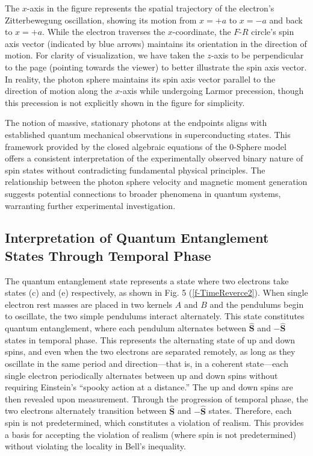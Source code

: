 \documentclass[%
 reprint,
 amsmath,amssymb,
 aps,
]{revtex4-1}
\numberwithin{equation}{section}%
\begin{document}
The $x$-axis in the figure represents the spatial trajectory of the electron's Zitterbewegung oscillation, showing its motion from $x=+a$ to $x=-a$ and back to $x=+a$. While the electron traverses the $x$-coordinate, the $F$-$R$ circle's spin axis vector (indicated by blue arrows) maintains its orientation in the direction of motion. For clarity of visualization, we have taken the $z$-axis to be perpendicular to the page (pointing towards the viewer) to better illustrate the spin axis vector. In reality, the photon sphere maintains its spin axis vector parallel to the direction of motion along the $x$-axis while undergoing Larmor precession, though this precession is not explicitly shown in the figure for simplicity.

The notion of massive, stationary photons at the endpoints aligns with established quantum mechanical observations in superconducting states. This framework provided by the closed algebraic equations of the 0-Sphere model offers a consistent interpretation of the experimentally observed binary nature of spin states without contradicting fundamental physical principles. The relationship between the photon sphere velocity and magnetic moment generation suggests potential connections to broader phenomena in quantum systems, warranting further experimental investigation.


\subsection{Interpretation of Quantum Entanglement States Through Temporal Phase}\label{subsec:quantum_entanglement}

The quantum entanglement state represents a state where two electrons take states (c) and (e) respectively, as shown in Fig. 5 (\ref{f-TimeReverce2}). When single electron rest masses are placed in two kernels $A$ and $B$ and the pendulums begin to oscillate, the two simple pendulums interact alternately. This state constitutes quantum entanglement, where each pendulum alternates between $\hat{\boldsymbol{S}}$ and $-\hat{\boldsymbol{S}}$ states in temporal phase. This represents the alternating state of up and down spins, and even when the two electrons are separated remotely, as long as they oscillate in the same period and direction—that is, in a coherent state—each single electron periodically alternates between up and down spins without requiring Einstein's ``spooky action at a distance.'' The up and down spins are then revealed upon measurement. Through the progression of temporal phase, the two electrons alternately transition between $\hat{\boldsymbol{S}}$ and $-\hat{\boldsymbol{S}}$ states. Therefore, each spin is not predetermined, which constitutes a violation of realism. This provides a basis for accepting the violation of realism (where spin is not predetermined) without violating the locality in Bell's inequality.
\end{document}
